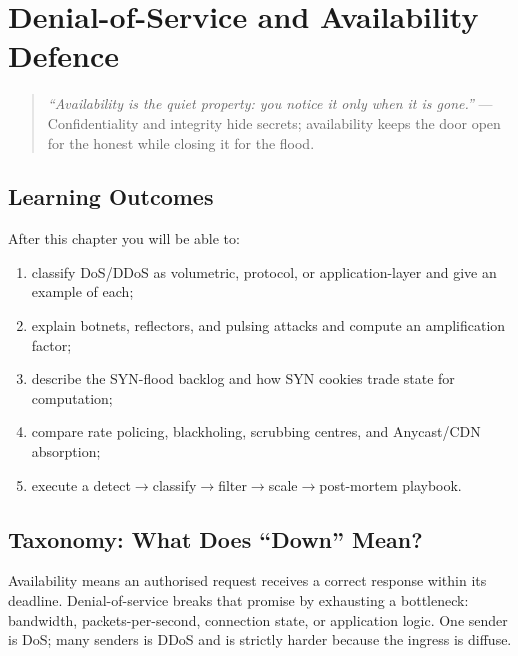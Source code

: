 \chapter{Denial-of-Service and Availability Defence}\label{ch:ddos}
\sloppy

\begin{quote}
\emph{``Availability is the quiet property: you notice it only when it is gone.''} --- Confidentiality and integrity hide secrets; availability keeps the door open for the honest while closing it for the flood.
\end{quote}

\noindent{}
\vspace{0.4em}

\section*{Learning Outcomes}
After this chapter you will be able to:
\begin{enumerate}[label=(L\arabic*)]
    \item classify DoS/DDoS as volumetric, protocol, or application-layer and give an example of each;
    \item explain botnets, reflectors, and pulsing attacks and compute an amplification factor;
    \item describe the SYN-flood backlog and how SYN cookies trade state for computation;
    \item compare rate policing, blackholing, scrubbing centres, and Anycast/CDN absorption;
    \item execute a detect$\to$classify$\to$filter$\to$scale$\to$post-mortem playbook.
\end{enumerate}

\section{Taxonomy: What Does ``Down'' Mean?}\label{sec:ddos-tax}
Availability means an authorised request receives a correct response within its deadline. Denial-of-service breaks that promise by exhausting a bottleneck: bandwidth, packets-per-second, connection state, or application logic. One sender is DoS; many senders is DDoS and is strictly harder because the ingress is diffuse.

